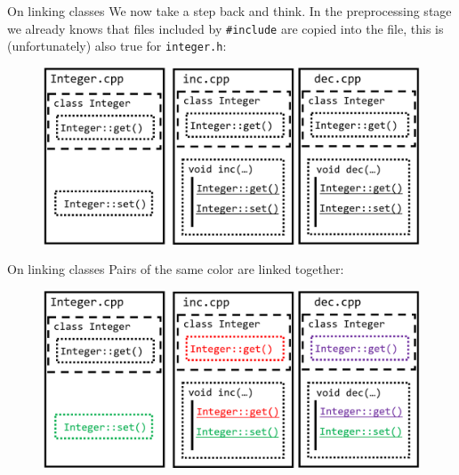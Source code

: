 \begin{frame}{On linking classes}
We now take a step back and think. In the preprocessing stage we already knows that files included by \texttt{\#include} are copied into the file, this is (unfortunately) also true for \texttt{integer.h}:

\vspace{-0.1in}
\begin{figure}
	\centering
	\includegraphics[scale=0.37]{fig/rc8link1}
\end{figure}

\end{frame}

\begin{frame}{On linking classes}
Pairs of the same color are linked together:
\begin{figure}
	\centering
	\includegraphics[scale=0.37]{fig/rc8link2}
\end{figure}
\end{frame}

